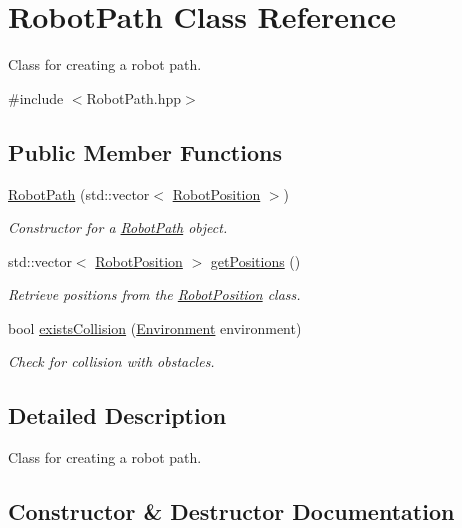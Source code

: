 \hypertarget{classRobotPath}{}\section{Robot\+Path Class Reference}
\label{classRobotPath}


Class for creating a robot path.  




{\ttfamily \#include $<$Robot\+Path.\+hpp$>$}

\subsection*{Public Member Functions}
\begin{DoxyCompactItemize}
\item 
\hyperlink{classRobotPath_ad4830998a6f4315b946be510b5c50733}{Robot\+Path} (std\+::vector$<$ \hyperlink{classRobotPosition}{Robot\+Position} $>$)
\begin{DoxyCompactList}\small\item\em Constructor for a \hyperlink{classRobotPath}{Robot\+Path} object. \end{DoxyCompactList}\item 
std\+::vector$<$ \hyperlink{classRobotPosition}{Robot\+Position} $>$ \hyperlink{classRobotPath_aa1fc081c6f032ea7ac1d48bd2bb81b8f}{get\+Positions} ()
\begin{DoxyCompactList}\small\item\em Retrieve positions from the \hyperlink{classRobotPosition}{Robot\+Position} class. \end{DoxyCompactList}\item 
bool \hyperlink{classRobotPath_a92e2647d35cfe7c53e182188debc5dac}{exists\+Collision} (\hyperlink{classEnvironment}{Environment} environment)
\begin{DoxyCompactList}\small\item\em Check for collision with obstacles. \end{DoxyCompactList}\end{DoxyCompactItemize}


\subsection{Detailed Description}
Class for creating a robot path. 

\subsection{Constructor \& Destructor Documentation}
